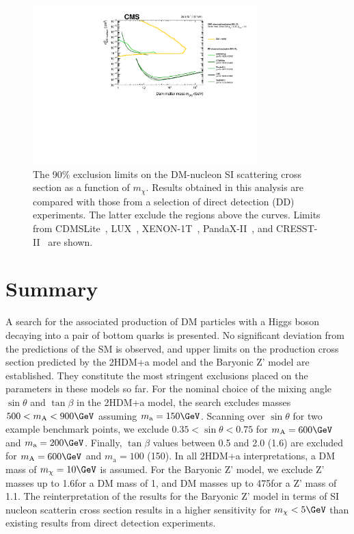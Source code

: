 \begin{figure}
  \centering
  \includegraphics[width=0.775\textwidth]{figures/limits/SpinIndepend_XsecDM_MonoHbb_bb_obs_Summary.pdf}
  \caption{The 90\% \CL exclusion limits on the DM-nucleon SI scattering cross section as a function of $m_\chi$. 
Results obtained in this analysis are compared with those from a selection of direct detection (DD) experiments. 
The latter exclude the regions above the curves. 
Limits from CDMSLite~\cite{CDMSLite}, LUX~\cite{LUX}, XENON-1T~\cite{XENON1T}, PandaX-II~\cite{PandaxII}, and CRESST-II~\cite{CresstII} are shown.}
  \label{fig:limitsdd}
\end{figure}


\section{Summary}

A search for the associated production of DM particles with a Higgs
boson decaying into a pair of bottom quarks is presented. No significant
deviation from the predictions of the SM is observed, and upper limits on
the production cross section predicted by the 2HDM+a model and the
Baryonic Z' model are established. They constitute the  most stringent  exclusions placed on the parameters in these
models so far. For the nominal choice of the mixing angle $\sin\theta$
and $\tan\beta$ in the 2HDM+a model, the search excludes masses
$500<m_\text{A}<900\GeV$ assuming $m_\text{a}=150\GeV$. Scanning over
$\sin\theta$ for two example benchmark points, we exclude
$0.35<\sin\theta<0.75$ for $m_\text{A}=600\GeV$ and
$m_\text{a}=200\GeV$.  Finally, $\tan\beta$ values between 0.5 and 2.0
(1.6) are excluded for $m_\text{A}=600\GeV$ and $m_\text{a}=100$
(150)\GeV. In all 2HDM+a interpretations, a DM mass of $m_\chi=10\GeV$ is assumed. For the Baryonic Z' model, we exclude Z' masses up to 1.6\TeV for a DM mass of 1\GeV, and DM masses up to 475\GeV for a Z' mass of 1.1\TeV. The reinterpretation of the results for the Baryonic Z' model in terms of SI nucleon scatterin cross section results in a higher sensitivity for $m_\chi<5\GeV$ than existing results from direct detection experiments. 

 
